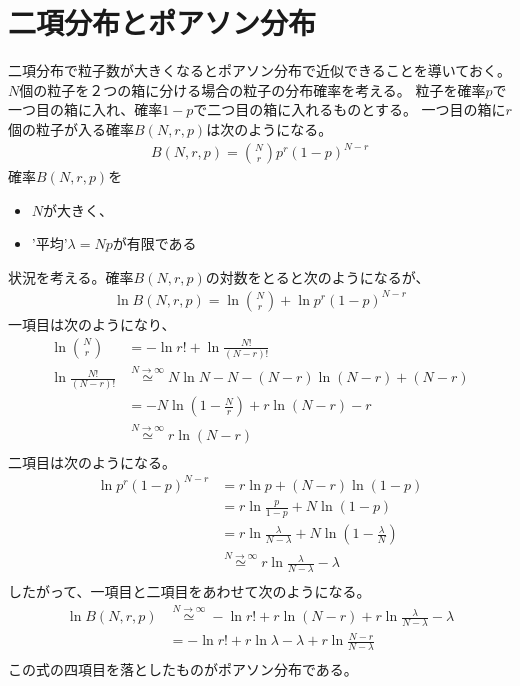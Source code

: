 \section{二項分布とポアソン分布}\label{s1:二項分布とポアソン分布} %
	二項分布で粒子数が大きくなるとポアソン分布で近似できることを導いておく。
	$N$個の粒子を２つの箱に分ける場合の粒子の分布確率を考える。
	粒子を確率$p$で一つ目の箱に入れ、確率$1-p$で二つ目の箱に入れるものとする。
	一つ目の箱に$r$個の粒子が入る確率$B(N,r,p)$は次のようになる。
	\begin{equation*}\begin{split} %
		B(N,r,p) = \binom{N}{r}p^r(1-p)^{N-r}
	\end{split}\end{equation*} %
	確率$B(N,r,p)$を
	\begin{itemize}\setlength{\itemsep}{-1mm} %
		\item $N$が大きく、
		\item '平均'$\lambda=Np$が有限である
	\end{itemize} %
	状況を考える。確率$B(N,r,p)$の対数をとると次のようになるが、
	\begin{equation*}\begin{split} %
		\ln B(N,r,p) = \ln \binom{N}{r} + \ln p^r(1-p)^{N-r}
	\end{split}\end{equation*} %
	一項目は次のようになり、
	\begin{equation*}\begin{split} %
		\ln \binom{N}{r} &= - \ln r! + \ln \frac{N!}{(N-r)!} \\
		\ln \frac{N!}{(N-r)!} 
			&\overset{N\to\infty}{\simeq} N\ln N - N - (N-r)\ln (N-r) + (N-r) \\
			&= - N\ln (1-\frac{N}{r}) + r\ln (N-r) -r \\
			&\overset{N\to\infty}{\simeq} r\ln (N-r) \\
	\end{split}\end{equation*} %
	二項目は次のようになる。
	\begin{equation*}\begin{split} %
		\ln p^r(1-p)^{N-r} &= r\ln p + (N-r)\ln (1-p) \\
			&= r\ln\frac{p}{1-p} + N\ln (1-p) \\
			&= r\ln\frac{\lambda}{N-\lambda} + N\ln (1-\frac{\lambda}{N}) \\
			&\overset{N\to\infty}{\simeq}
				r\ln\frac{\lambda}{N-\lambda} - \lambda \\
	\end{split}\end{equation*} %
	したがって、一項目と二項目をあわせて次のようになる。
	\begin{equation*}\begin{split} %
		\ln B(N,r,p) 
			&\overset{N\to\infty}{\simeq}
				- \ln r! + r\ln (N-r) + r\ln\frac{\lambda}{N-\lambda} - \lambda \\
			&= -\ln r! + r\ln\lambda - \lambda + r\ln\frac{N-r}{N-\lambda} \\
	\end{split}\end{equation*} %
	この式の四項目を落としたものがポアソン分布である。

